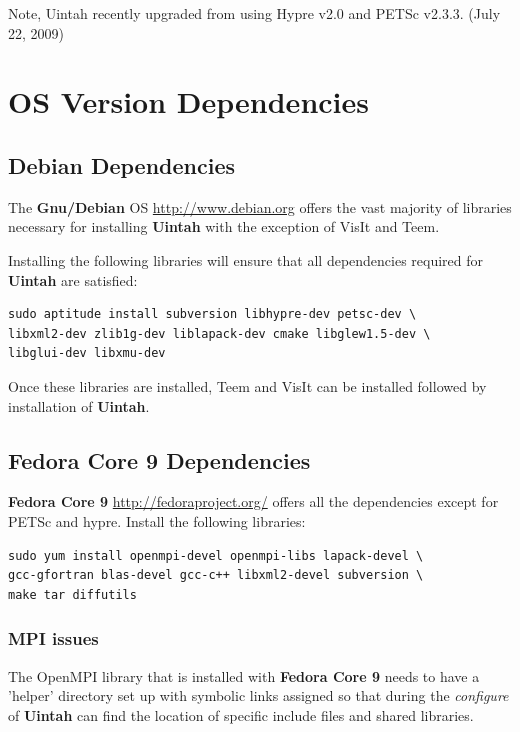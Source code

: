 \documentclass[12pt]{article}
\begin{document}
Note, Uintah recently upgraded from using Hypre v2.0 and PETSc
v2.3.3.  (July 22, 2009)

\section{OS Version Dependencies}

\subsection{Debian Dependencies}

The \textbf{Gnu/Debian} OS \url{http://www.debian.org} offers the vast majority of libraries necessary for
installing \textbf{Uintah} with the exception of VisIt and Teem.

Installing the following libraries will ensure that all dependencies
required for \textbf{Uintah} are satisfied: 

\begin{verbatim} 
sudo aptitude install subversion libhypre-dev petsc-dev \ 
libxml2-dev zlib1g-dev liblapack-dev cmake libglew1.5-dev \
libglui-dev libxmu-dev
\end{verbatim}

Once these libraries are installed, Teem and VisIt can be installed
followed by installation of \textbf{Uintah}.

\subsection{Fedora Core 9 Dependencies}

\textbf{Fedora Core 9} \url{http://fedoraproject.org/} offers all the
dependencies except for PETSc and hypre.  Install the following
libraries:
\begin{verbatim}
sudo yum install openmpi-devel openmpi-libs lapack-devel \
gcc-gfortran blas-devel gcc-c++ libxml2-devel subversion \ 
make tar diffutils
\end{verbatim}

\subsubsection{MPI issues} 
\label{sec:mpi}

The OpenMPI library that is installed with \textbf{Fedora Core 9}
needs to have a 'helper' directory set up with symbolic links assigned
so that during the \emph{configure} of \textbf{Uintah} can find the
location of specific include files and shared libraries.
\end{document}
